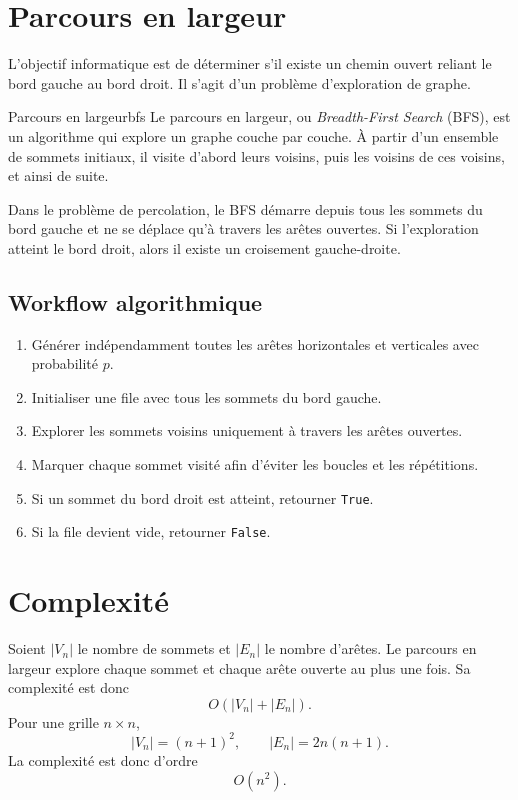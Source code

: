 \documentclass[11pt,a4paper]{report}
\begin{document}
\section{Parcours en largeur}

L'objectif informatique est de déterminer s'il existe un chemin ouvert reliant le bord gauche au bord droit. Il s'agit d'un problème d'exploration de graphe.

\begin{definitionbox}{Parcours en largeur}{bfs}
Le parcours en largeur, ou \textit{Breadth-First Search} (BFS), est un algorithme qui explore un graphe couche par couche. À partir d'un ensemble de sommets initiaux, il visite d'abord leurs voisins, puis les voisins de ces voisins, et ainsi de suite.
\end{definitionbox}

Dans le problème de percolation, le BFS démarre depuis tous les sommets du bord gauche et ne se déplace qu'à travers les arêtes ouvertes. Si l'exploration atteint le bord droit, alors il existe un croisement gauche-droite.

\subsection*{Workflow algorithmique}

\begin{enumerate}
    \item Générer indépendamment toutes les arêtes horizontales et verticales avec probabilité $p$.
    \item Initialiser une file avec tous les sommets du bord gauche.
    \item Explorer les sommets voisins uniquement à travers les arêtes ouvertes.
    \item Marquer chaque sommet visité afin d'éviter les boucles et les répétitions.
    \item Si un sommet du bord droit est atteint, retourner \texttt{True}.
    \item Si la file devient vide, retourner \texttt{False}.
\end{enumerate}

\section{Complexité}

Soient $|V_n|$ le nombre de sommets et $|E_n|$ le nombre d'arêtes. Le parcours en largeur explore chaque sommet et chaque arête ouverte au plus une fois. Sa complexité est donc
\[
O(|V_n|+|E_n|).
\]
Pour une grille $n\times n$,
\[
|V_n|=(n+1)^2,
\qquad
|E_n|=2n(n+1).
\]
La complexité est donc d'ordre
\[
O(n^2).
\]
\end{document}
